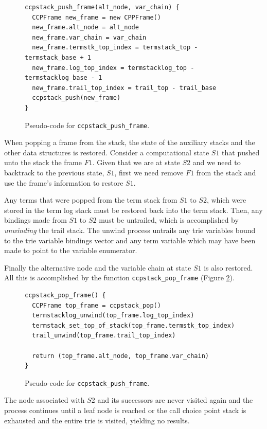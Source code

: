 \begin{figure}[ht]
\begin{Verbatim}
ccpstack_push_frame(alt_node, var_chain) {
  CCPFrame new_frame = new CPPFrame()
  new_frame.alt_node = alt_node
  new_frame.var_chain = var_chain
  new_frame.termstk_top_index = termstack_top - termstack_base + 1
  new_frame.log_top_index = termstacklog_top - termstacklog_base - 1
  new_frame.trail_top_index = trail_top - trail_base
  ccpstack_push(new_frame)
}
\end{Verbatim}
\caption{Pseudo-code for \texttt{ccpstack\_push\_frame}.}
\label{fig:ccpstack_push_frame}
\end{figure}

When popping a frame from the stack, the state of the auxiliary stacks and the other data
structures is restored. Consider a computational state $S1$ that pushed unto the stack
the frame $F1$. Given that we are at state $S2$ and we need to backtrack to the previous state, $S1$,
first we need remove $F1$ from the stack and use the frame's information to restore $S1$.

Any terms that were popped from the term stack from $S1$ to $S2$, which were
stored in the term log stack must be restored back into the term stack.
Then, any bindings made from $S1$ to $S2$ must be untrailed, which is
accomplished by \textit{unwinding} the trail stack. The unwind process untrails
any trie variables bound to the trie variable bindings vector
and any term variable which may have been made to point to the variable enumerator. 

Finally the alternative node and
the variable chain at state $S1$ is also restored. All this is accomplished by the
function \texttt{ccpstack\_pop\_frame} (Figure \ref{fig:ccpstack_pop_frame}).

\begin{figure}[ht]
\begin{Verbatim}
ccpstack_pop_frame() {
  CCPFrame top_frame = ccpstack_pop()
  termstacklog_unwind(top_frame.log_top_index)
  termstack_set_top_of_stack(top_frame.termstk_top_index)
  trail_unwind(top_frame.trail_top_index)
  
  return (top_frame.alt_node, top_frame.var_chain)
}
\end{Verbatim}
\caption{Pseudo-code for \texttt{ccpstack\_push\_frame}.}
\label{fig:ccpstack_pop_frame}
\end{figure}

The node associated with $S2$ and its successors are never visited again and
the process continues until a leaf node is reached or the call choice point stack
is exhausted and the entire trie is visited, yielding no results.


